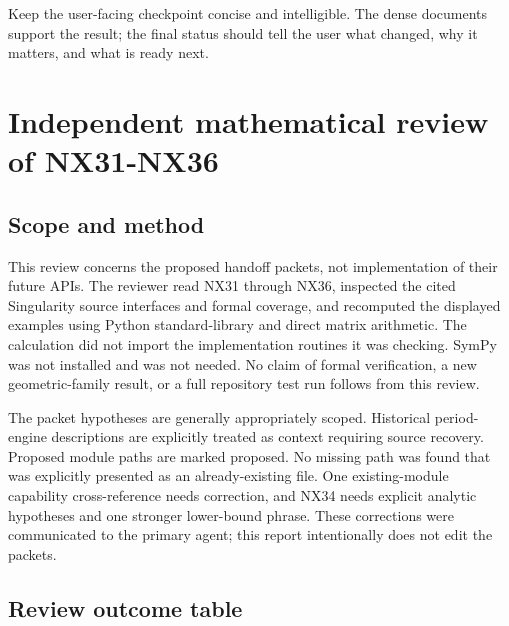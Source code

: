 \documentclass[
  11pt,
  a4paper,
]{report}
\let\nxtexttt\texttt
\renewcommand{\texttt}[1]{\nxtexttt{\seqsplit{#1}}}
\begin{document}
Keep the user-facing checkpoint concise and intelligible. The dense
documents support the result; the final status should tell the user what
changed, why it matters, and what is ready next.

\hypertarget{independent-mathematical-review-of-nx31-nx36}{%
\chapter{Independent mathematical review of
NX31-NX36}\label{independent-mathematical-review-of-nx31-nx36}}

\hypertarget{scope-and-method}{%
\section{Scope and method}\label{scope-and-method}}

This review concerns the proposed handoff packets, not implementation of
their future APIs. The reviewer read NX31 through NX36, inspected the
cited Singularity source interfaces and formal coverage, and recomputed
the displayed examples using Python standard-library
\texttt{fractions.Fraction} and direct matrix arithmetic. The
calculation did not import the implementation routines it was checking.
SymPy was not installed and was not needed. No claim of formal
verification, a new geometric-family result, or a full repository test
run follows from this review.

The packet hypotheses are generally appropriately scoped. Historical
period-engine descriptions are explicitly treated as context requiring
source recovery. Proposed module paths are marked proposed. No missing
path was found that was explicitly presented as an already-existing
file. One existing-module capability cross-reference needs correction,
and NX34 needs explicit analytic hypotheses and one stronger lower-bound
phrase. These corrections were communicated to the primary agent; this
report intentionally does not edit the packets.

\hypertarget{review-outcome-table}{%
\section{Review outcome table}\label{review-outcome-table}}
\end{document}
